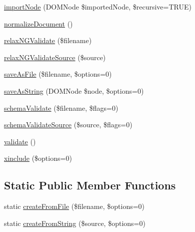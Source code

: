 \begin{DoxyCompactItemize}
\item 
\hyperlink{interface_able_polecat___dom___document_interface_a9d4357accf2f59eb78c36f7d2cfc254b}{import\+Node} (D\+O\+M\+Node \$imported\+Node, \$recursive=T\+R\+U\+E)
\item 
\hyperlink{interface_able_polecat___dom___document_interface_a74423abfbd25dfd20d7d2278e5ddae40}{normalize\+Document} ()
\item 
\hyperlink{interface_able_polecat___dom___document_interface_ab9ad7a19d83b5bda1418a3c5eabe1bc2}{relax\+N\+G\+Validate} (\$filename)
\item 
\hyperlink{interface_able_polecat___dom___document_interface_a230832c86e1d5646515b7c1565477bac}{relax\+N\+G\+Validate\+Source} (\$source)
\item 
\hyperlink{interface_able_polecat___dom___document_interface_af3bb53733978ca9f7b6883b5ec65a67f}{save\+As\+File} (\$filename, \$options=0)
\item 
\hyperlink{interface_able_polecat___dom___document_interface_af12ec29a0fd36c8b977895a2ea7ef95e}{save\+As\+String} (D\+O\+M\+Node \$node, \$options=0)
\item 
\hyperlink{interface_able_polecat___dom___document_interface_a86f7eb82d725a553ab5c51b6116a1752}{schema\+Validate} (\$filename, \$flags=0)
\item 
\hyperlink{interface_able_polecat___dom___document_interface_af62111546c069afb59029ab0fe522607}{schema\+Validate\+Source} (\$source, \$flags=0)
\item 
\hyperlink{interface_able_polecat___dom___document_interface_a184909dab34698899937d810a9f5d393}{validate} ()
\item 
\hyperlink{interface_able_polecat___dom___document_interface_a3d0818bb6eda112a1b359cc41b40b2a9}{xinclude} (\$options=0)
\end{DoxyCompactItemize}
\subsection*{Static Public Member Functions}
\begin{DoxyCompactItemize}
\item 
static \hyperlink{interface_able_polecat___dom___document_interface_afddfc3d9b5456225cd1c4bb66e296342}{create\+From\+File} (\$filename, \$options=0)
\item 
static \hyperlink{interface_able_polecat___dom___document_interface_a01f8bd6cfb92479f18bce6243cde7aa0}{create\+From\+String} (\$source, \$options=0)
\end{DoxyCompactItemize}


